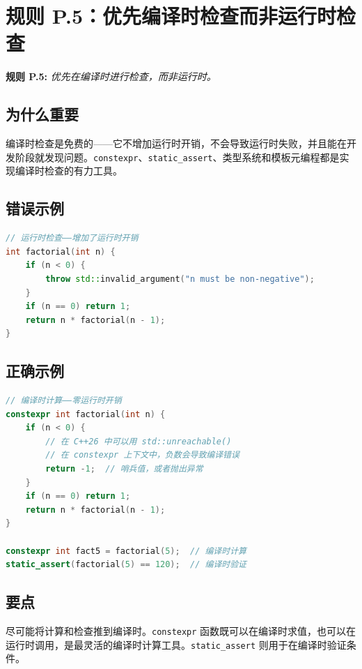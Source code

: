 \section{规则 P.5：优先编译时检查而非运行时检查}

\textbf{规则 P.5:} \textit{优先在编译时进行检查，而非运行时。}

\subsection{为什么重要}

编译时检查是免费的——它不增加运行时开销，不会导致运行时失败，并且能在开发阶段就发现问题。\texttt{constexpr}、\texttt{static\_assert}、类型系统和模板元编程都是实现编译时检查的有力工具。

\subsection{错误示例}

\begin{lstlisting}[language=C++]
// 运行时检查——增加了运行时开销
int factorial(int n) {
    if (n < 0) {
        throw std::invalid_argument("n must be non-negative");
    }
    if (n == 0) return 1;
    return n * factorial(n - 1);
}
\end{lstlisting}

\subsection{正确示例}

\begin{lstlisting}[language=C++]
// 编译时计算——零运行时开销
constexpr int factorial(int n) {
    if (n < 0) {
        // 在 C++26 中可以用 std::unreachable()
        // 在 constexpr 上下文中，负数会导致编译错误
        return -1;  // 哨兵值，或者抛出异常
    }
    if (n == 0) return 1;
    return n * factorial(n - 1);
}

constexpr int fact5 = factorial(5);  // 编译时计算
static_assert(factorial(5) == 120);  // 编译时验证
\end{lstlisting}

\subsection{要点}
尽可能将计算和检查推到编译时。\texttt{constexpr} 函数既可以在编译时求值，也可以在运行时调用，是最灵活的编译时计算工具。\texttt{static\_assert} 则用于在编译时验证条件。

